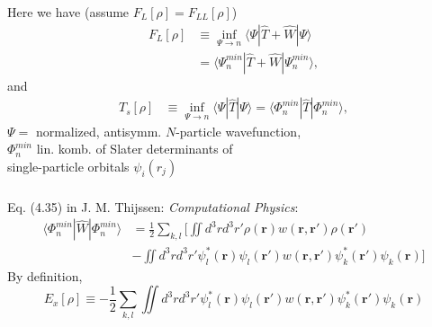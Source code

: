\documentclass[compress]{beamer}
\newcommand*{\ket}[1]{|#1\rangle}
\newcommand*{\bra}[1]{\langle#1|}
\begin{document}
\frame
{ 
  \frametitle{}
  \begin{small}
    {\scriptsize
      Here we have (assume $F_{L}[\rho]=F_{LL}[\rho]$)
      \begin{align}
        F_{L}[\rho]&\equiv \inf_{\Psi \rightarrow n}\bra{\Psi }\hat{T}+\hat{W}\ket{\Psi } \nonumber \\
        &=\bra{\Psi_{n}^{min}}\hat{T}+\hat{W}\ket{\Psi_{n}^{min}}, \nonumber 
      \end{align}
      and 
      \begin{align}
        T_{s}[\rho]&\equiv \inf_{\Psi \rightarrow n}\bra{\Psi }\hat{T}\ket{\Psi }=\bra{\Phi_{n}^{min}}\hat{T}\ket{\Phi_{n}^{min}}, \nonumber 
      \end{align}
      $\Psi = $ normalized, antisymm. $N$-particle wavefunction, \\
      $\Phi_{n}^{min}$ lin. komb. of Slater determinants of \\
      single-particle orbitals $\psi_{i}(r_{j})$ 
    }
  \end{small}
}

\frame
{ 
  \frametitle{}
  \begin{small}
    {\scriptsize
      Eq. (4.35) in J. M. Thijssen: \emph{Computational Physics}:
      \begin{align}
        \bra{\Phi_{n}^{min}}\hat{W}\ket{\Phi_{n}^{min}}&=\frac{1}{2}\sum_{k,l}\bigg[ \iint d^{3}r d^{3}r' \rho(\mathbf{r})w(\mathbf{r},\mathbf{r}')\rho(\mathbf{r}') \nonumber \\
        &-\iint d^{3}r d^{3}r' \psi_{l}^{*}(\mathbf{r})\psi_{l}(\mathbf{r}')w(\mathbf{r},\mathbf{r}')\psi_{k}^{*}(\mathbf{r}')\psi_{k}(\mathbf{r})\bigg] \nonumber
      \end{align}
      By definition,
      \begin{equation}
        E_{x}[\rho]\equiv -\frac{1}{2}\sum_{k,l}\iint d^{3}r d^{3}r' \psi_{l}^{*}(\mathbf{r})\psi_{l}(\mathbf{r}')w(\mathbf{r},\mathbf{r}')\psi_{k}^{*}(\mathbf{r}')\psi_{k}(\mathbf{r})  \nonumber
      \end{equation}
    }
  \end{small}
}
\end{document}
